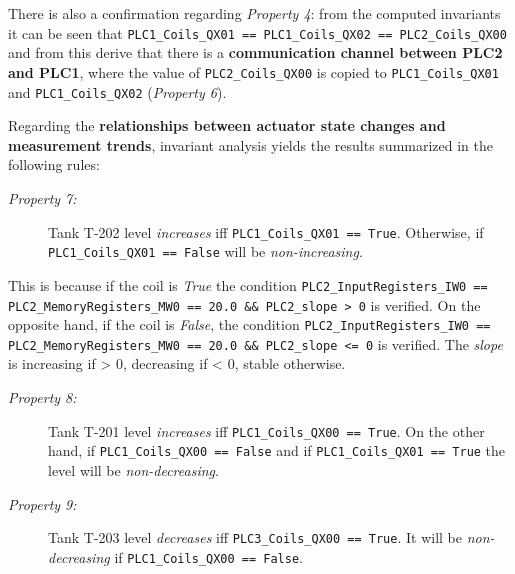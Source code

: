 \bigskip
There is also a confirmation regarding \textit{Property 4}: from the computed invariants it can be seen that \newline \newline
\small\texttt{PLC1\_Coils\_QX01 == PLC1\_Coils\_QX02 == PLC2\_Coils\_QX00}\newline \newline
\normalsize and from this derive that there is a \textbf{communication channel between PLC2 and PLC1}, where the value of \texttt{PLC2\_Coils\_QX00} is copied to \texttt{PLC1\_Coils\_QX01} and \texttt{PLC1\_Coils\_QX02} (\textit{Property 6}).

\bigskip
Regarding the \textbf{relationships between actuator state changes and measurement trends}, invariant analysis yields the results summarized in the following rules:

\begin{description}
	\item[\colorbox{backcolourtext}{\normalfont\textit{Property 7:}}] Tank T-202 level \textit{increases} iff \texttt{PLC1\_Coils\_QX01 == True}. Otherwise, if \texttt{PLC1\_Coils\_QX01 == False} will be \textit{non-increasing}.
\end{description}
	This is because if the coil is \textit{True} the condition \newline \scriptsize\texttt{PLC2\_InputRegisters\_IW0 == PLC2\_MemoryRegisters\_MW0 == 20.0 \&\& PLC2\_slope > 0} \newline \normalsize is verified. 
	On the opposite hand, if the coil is \textit{False}, the condition \newline \scriptsize\texttt{PLC2\_InputRegisters\_IW0 == PLC2\_MemoryRegisters\_MW0 == 20.0 \&\& PLC2\_slope <= 0}  \normalsize is verified. The \textit{slope} is increasing if > 0, decreasing if < 0, stable otherwise.

\begin{description}
	\item[\colorbox{backcolourtext}{\normalfont\textit{Property 8:}}] Tank T-201 level \textit{increases} iff \texttt{PLC1\_Coils\_QX00 == True}. On the other hand, if \texttt{PLC1\_Coils\_QX00 == False} and if \texttt{PLC1\_Coils\_QX01 == True} the level will be \textit{non-decreasing}.
	
	\item[\colorbox{backcolourtext}{\normalfont\textit{Property 9:}}] Tank T-203 level \textit{decreases} iff \texttt{PLC3\_Coils\_QX00 == True}. It will be \textit{non-decreasing} if \texttt{PLC1\_Coils\_QX00 == False}.
\end{description}

